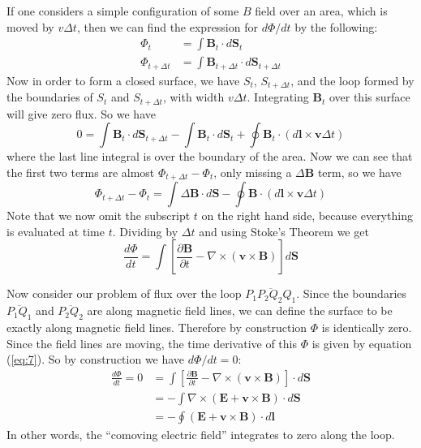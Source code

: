 \documentclass[letterpaper, 11pt]{article}
\numberwithin{equation}{section}
\numberwithin{figure}{section}
\begin{document}
If one considers a simple configuration of some $B$ field over an area, which is moved by $v\Delta t$, then we can find the expression for $d\Phi/dt$ by the following:
\begin{align}
  \Phi_t &= \int \boldsymbol{B}_t\cdot d\boldsymbol{S}_t \\
  \Phi_{t + \Delta t} &= \int \boldsymbol{B}_{t + \Delta t}\cdot d\boldsymbol{S}_{t + \Delta t}
\end{align}
Now in order to form a closed surface, we have $S_t$, $S_{t + \Delta t}$, and the loop formed by the boundaries of $S_t$ and $S_{t + \Delta t}$, with width $v\Delta t$. Integrating $\boldsymbol{B}_t$ over this surface will give zero flux. So we have
\begin{equation}
    \label{eq:5}
    0 = \int \boldsymbol{B}_t\cdot d\boldsymbol{S}_{t + \Delta t} - \int \boldsymbol{B}_t\cdot d\boldsymbol{S}_t + \oint \boldsymbol{B}_t\cdot (d\boldsymbol{l} \times \boldsymbol{v}\Delta t)
\end{equation}
where the last line integral is over the boundary of the area. Now we can see that the first two terms are almost $\Phi_{t + \Delta t} - \Phi_t$, only missing a $\Delta \boldsymbol{B}$ term, so we have
\begin{equation}
    \label{eq:6}
    \Phi_{t + \Delta t} - \Phi_t = \int \Delta \boldsymbol{B}\cdot d\boldsymbol{S} - \oint \boldsymbol{B}\cdot (d\boldsymbol{l}\times \boldsymbol{v}\Delta t)
\end{equation}
Note that we now omit the subscript $t$ on the right hand side, because everything is evaluated at time $t$. Dividing by $\Delta t$ and using Stoke's Theorem we get
\begin{equation}
    \label{eq:7}
    \frac{d\Phi}{dt} = \int \left[ \frac{\partial \boldsymbol{B}}{\partial t} - \nabla\times(\boldsymbol{v}\times \boldsymbol{B}) \right] d\boldsymbol{S}
\end{equation}

Now consider our problem of flux over the loop $\overline{P_1P_2Q_2Q_1}$. Since the boundaries $\overline{P_1Q_1}$ and $\overline{P_2Q_2}$ are along magnetic field lines, we can define the surface to be exactly along magnetic field lines. Therefore by construction $\Phi$ is identically zero. Since the field lines are moving, the time derivative of this $\Phi$ is given by equation (\ref{eq:7}). So by construction we have $d\Phi/dt = 0$:
\begin{equation}
    \begin{split}
        \frac{d\Phi}{dt} = 0 &= \int \left[ \frac{\partial \boldsymbol{B}}{\partial t} - \nabla\times(\boldsymbol{v}\times \boldsymbol{B}) \right]\cdot d\boldsymbol{S} \\
        &= -\int \nabla\times(\boldsymbol{E} + \boldsymbol{v}\times \boldsymbol{B})\cdot d\boldsymbol{S} \\
        &= -\oint (\boldsymbol{E} + \boldsymbol{v}\times \boldsymbol{B})\cdot d\boldsymbol{l}
    \end{split}
\end{equation}
In other words, the ``comoving electric field'' integrates to zero along the loop.
\end{document}
